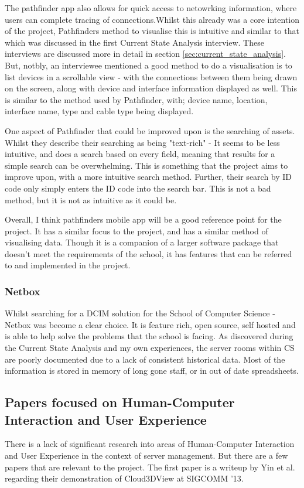 \documentclass [12pt,letterpaper]{article}
\begin{document}
The pathfinder app also allows for quick access to netowrking information, where users can complete tracing of connections.Whilst this already was a core intention of the project, Pathfinders method to visualise this is intuitive and similar to that which was discussed in the first Current State Analysis interview. These interviews are discussed more in detail in section \ref{sec:current_state_analysis}. But, notbly, an interviewee mentioned a good method to do a visualisation is to list devices in a scrollable view - with the connections between them being drawn on the screen, along with device and interface information displayed as well. This is similar to the method used by Pathfinder, with; device name, location, interface name, type and cable type being displayed. 

One aspect of Pathfinder that could be improved upon is the searching of assets. Whilst they describe their searching as being "text-rich" - It seems to be less intuitive, and does a search based on every field, meaning that results for a simple search can be overwhelming. This is something that the project aims to improve upon, with a more intuitive search method. Further, their search by ID code only simply enters the ID code into the search bar. This is not a bad method, but it is not as intuitive as it could be. 

Overall, I think pathfinders mobile app will be a good reference point for the project. It has a similar focus to the project, and has a similar method of visualising data. Though it is a companion of a larger software package that doesn't meet the requirements of the school, it has features that can be referred to and implemented in the project.

\subsubsection{Netbox}
\label{sec:netbox}
Whilst searching for a DCIM solution for the School of Computer Science - Netbox was become a clear choice. It is feature rich, open source, self hosted and is able to help solve the problems that the school is facing. As discovered during the Current State Analysis and my own experiences, the server rooms within CS are poorly documented due to a lack of consistent historical data. Most of the information is stored in memory of long gone staff, or in out of date spreadsheets.  

\subsection{Papers focused on Human-Computer Interaction and User Experience}
\label{sec:HCI}
There is a lack of significant research into areas of Human-Computer Interaction and User Experience in the context of server management. But there are a few papers that are relevant to the project. The first paper is a writeup by Yin et al. \cite{cloud3dview} regarding their demonstration of Cloud3DView at SIGCOMM '13. 
\end{document}
